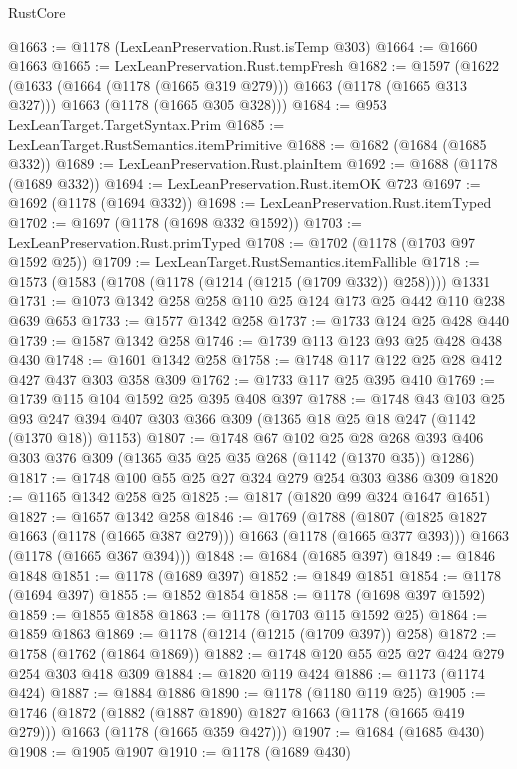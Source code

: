 \begin{lexlean}{RustCore}
\begin{coremodule}
@1663 := @1178 (LexLeanPreservation.Rust.isTemp @303)
@1664 := @1660 @1663
@1665 := LexLeanPreservation.Rust.tempFresh
@1682 := @1597
    (@1622
      (@1633 (@1664 (@1178 (@1665 @319 @279))) @1663 (@1178 (@1665 @313 @327)))
      @1663
      (@1178 (@1665 @305 @328)))
@1684 := @953 LexLeanTarget.TargetSyntax.Prim
@1685 := LexLeanTarget.RustSemantics.itemPrimitive
@1688 := @1682 (@1684 (@1685 @332))
@1689 := LexLeanPreservation.Rust.plainItem
@1692 := @1688 (@1178 (@1689 @332))
@1694 := LexLeanPreservation.Rust.itemOK @723
@1697 := @1692 (@1178 (@1694 @332))
@1698 := LexLeanPreservation.Rust.itemTyped
@1702 := @1697 (@1178 (@1698 @332 @1592))
@1703 := LexLeanPreservation.Rust.primTyped
@1708 := @1702 (@1178 (@1703 @97 @1592 @25))
@1709 := LexLeanTarget.RustSemantics.itemFallible
@1718 := @1573 (@1583 (@1708 (@1178 (@1214 (@1215 (@1709 @332)) @258)))) @1331
@1731 := @1073 @1342 @258 @258 @110 @25 @124 @173 @25 @442 @110 @238 @639 @653
@1733 := @1577 @1342 @258
@1737 := @1733 @124 @25 @428 @440
@1739 := @1587 @1342 @258
@1746 := @1739 @113 @123 @93 @25 @428 @438 @430
@1748 := @1601 @1342 @258
@1758 := @1748 @117 @122 @25 @28 @412 @427 @437 @303 @358 @309
@1762 := @1733 @117 @25 @395 @410
@1769 := @1739 @115 @104 @1592 @25 @395 @408 @397
@1788 := @1748
    @43
    @103
    @25
    @93
    @247
    @394
    @407
    @303
    @366
    @309
    (@1365 @18 @25 @18 @247 (@1142 (@1370 @18)) @1153)
@1807 := @1748
    @67
    @102
    @25
    @28
    @268
    @393
    @406
    @303
    @376
    @309
    (@1365 @35 @25 @35 @268 (@1142 (@1370 @35)) @1286)
@1817 := @1748 @100 @55 @25 @27 @324 @279 @254 @303 @386 @309
@1820 := @1165 @1342 @258 @25
@1825 := @1817 (@1820 @99 @324 @1647 @1651)
@1827 := @1657 @1342 @258
@1846 := @1769
    (@1788
      (@1807 (@1825 @1827 @1663 (@1178 (@1665 @387 @279))) @1663 (@1178 (@1665 @377 @393)))
      @1663
      (@1178 (@1665 @367 @394)))
@1848 := @1684 (@1685 @397)
@1849 := @1846 @1848
@1851 := @1178 (@1689 @397)
@1852 := @1849 @1851
@1854 := @1178 (@1694 @397)
@1855 := @1852 @1854
@1858 := @1178 (@1698 @397 @1592)
@1859 := @1855 @1858
@1863 := @1178 (@1703 @115 @1592 @25)
@1864 := @1859 @1863
@1869 := @1178 (@1214 (@1215 (@1709 @397)) @258)
@1872 := @1758 (@1762 (@1864 @1869))
@1882 := @1748 @120 @55 @25 @27 @424 @279 @254 @303 @418 @309
@1884 := @1820 @119 @424
@1886 := @1173 (@1174 @424)
@1887 := @1884 @1886
@1890 := @1178 (@1180 @119 @25)
@1905 := @1746
    (@1872
      (@1882 (@1887 @1890) @1827 @1663 (@1178 (@1665 @419 @279)))
      @1663
      (@1178 (@1665 @359 @427)))
@1907 := @1684 (@1685 @430)
@1908 := @1905 @1907
@1910 := @1178 (@1689 @430)

\end{coremodule}
\end{lexlean}
